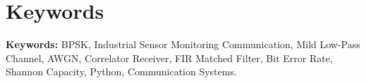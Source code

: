 \chapter*{Keywords}

\textbf{Keywords:} BPSK, Industrial Sensor Monitoring Communication, Mild Low-Pass Channel, AWGN, Correlator Receiver, FIR Matched Filter, Bit Error Rate, Shannon Capacity, Python, Communication Systems.

\clearpage